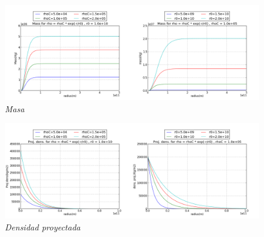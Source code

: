 \documentclass[12pt]{book}
\begin{document}
\begin{description}
\item

\begin{figure}[!ht]
 \centering
 \includegraphics[scale=0.33]{massFinal.png}
 \caption{\emph{Masa}}
\end{figure}

\item

\begin{figure}[!ht]
 \centering
 \includegraphics[scale=0.33]{dpFinal.png}
 \caption{\emph{Densidad proyectada}}
\end{figure}

\end{description}


\clearpage
\end{document}
